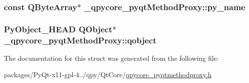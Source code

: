 \subsubsection[{py\+\_\+name}]{\setlength{\rightskip}{0pt plus 5cm}const Q\+Byte\+Array$\ast$ \+\_\+qpycore\+\_\+pyqt\+Method\+Proxy\+::py\+\_\+name}\label{struct__qpycore__pyqtMethodProxy_aa01d1168a8bad81f7864ff02192b3387}
\hypertarget{struct__qpycore__pyqtMethodProxy_a2f5b059a8e34aaf6a7ff431d3e9f01de}{}
\subsubsection[{qobject}]{\setlength{\rightskip}{0pt plus 5cm}Py\+Object\+\_\+\+H\+E\+A\+D Q\+Object$\ast$ \+\_\+qpycore\+\_\+pyqt\+Method\+Proxy\+::qobject}\label{struct__qpycore__pyqtMethodProxy_a2f5b059a8e34aaf6a7ff431d3e9f01de}


The documentation for this struct was generated from the following file\+:\begin{DoxyCompactItemize}
\item 
packages/\+Py\+Qt-\/x11-\/gpl-\/4../qpy/\+Qt\+Core/\hyperlink{qpycore__pyqtmethodproxy_8h}{qpycore\+\_\+pyqtmethodproxy.\+h}\end{DoxyCompactItemize}
